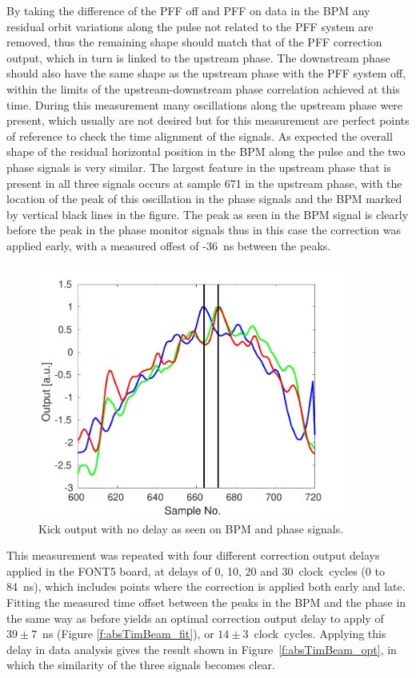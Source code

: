 By taking the difference of the PFF off and PFF on data in the BPM any residual orbit variations along the pulse not related to the PFF system are removed, thus the remaining shape should match that of the PFF correction output, which in turn is linked to the upstream phase. The downstream phase should also have the same shape as the upstream phase with the PFF system off, within the limits of the upstream-downstream phase correlation achieved at this time. During this measurement many oscillations along the upstream phase were present, which usually are not desired but for this measurement are perfect points of reference to check the time alignment of the signals. As expected the overall shape of the residual horizontal position in the BPM along the pulse and the two phase signals is very similar. The largest feature in the upstream phase that is present in all three signals occurs at sample 671 in the upstream phase, with the location of the peak of this oscillation in the phase signals and the BPM marked by vertical black lines in the figure. The peak as seen in the BPM signal is clearly before the peak in the phase monitor signals thus in this case the correction was applied early, with a measured offest of -36~ns between the peaks.

\begin{figure}
  \centering
  \includegraphics[width=0.9\textwidth]{Figures/commissioning/absTimBeam_d0}
  \caption{Kick output with no delay as seen on BPM and phase signals.}
  \label{f:absTimBeam_d0}
\end{figure}

This measurement was repeated with four different correction output delays applied in the FONT5 board, at delays of 0, 10, 20 and 30~clock~cycles (0 to 84~ns), which includes points where the correction is applied both early and late. Fitting the measured time offset between the peaks in the BPM and the phase in the same way as before yields an optimal correction output delay to apply of \(39\pm7\)~ns (Figure \ref{f:absTimBeam_fit}), or \(14\pm3\)~clock~cycles. Applying this delay in data analysis gives the result shown in Figure~\ref{f:absTimBeam_opt}, in which the similarity of the three signals becomes clear.

